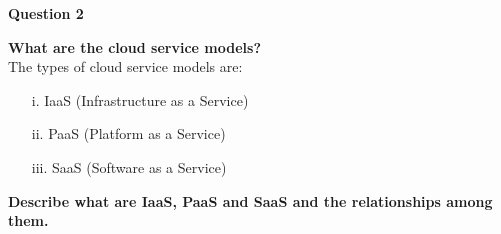 \documentclass[a4paper, 12pt]{article}
\begin{document}
\newpage
\begin{center}
	\textbf{Question 2}\\
\end{center}

\textbf{What are the cloud service models?}\\

The types of cloud service models are:
\begin{itemize}
\item[i.]
IaaS (Infrastructure as a Service)
\item[ii.]
PaaS (Platform as a Service)
\item[iii.]
SaaS (Software as a Service)
\end{itemize}

\textbf{Describe what are IaaS, PaaS and SaaS and the relationships among them.}\\
\end{document}
